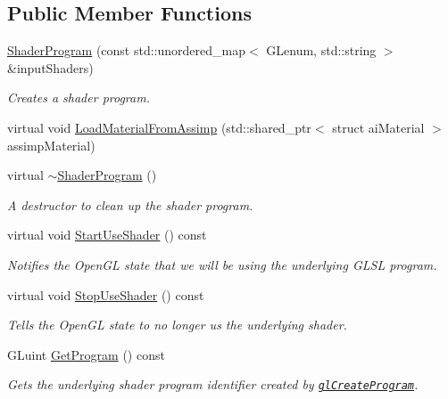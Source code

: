 \subsection*{Public Member Functions}
\begin{DoxyCompactItemize}
\item
\hyperlink{class_shader_program_aba2db5734b2f70cc34078126ad279588}{Shader\+Program} (const std\+::unordered\+\_\+map$<$ G\+Lenum, std\+::string $>$ \&input\+Shaders)
\begin{DoxyCompactList}\small\item\em Creates a shader program. \end{DoxyCompactList}\item
virtual void \hyperlink{class_shader_program_a51ac6fbf3a3d88643eef303a4c3a1fa8}{Load\+Material\+From\+Assimp} (std\+::shared\+\_\+ptr$<$ struct ai\+Material $>$ assimp\+Material)
\item
virtual \hyperlink{class_shader_program_a2d2eadcfc48cc2e2ddb82aba70553a9f}{$\sim$\+Shader\+Program} ()
\begin{DoxyCompactList}\small\item\em A destructor to clean up the shader program. \end{DoxyCompactList}\item
virtual void \hyperlink{class_shader_program_aab1241c0f0962d43687d92866d7b7d6a}{Start\+Use\+Shader} () const
\begin{DoxyCompactList}\small\item\em Notifies the Open\+GL state that we will be using the underlying G\+L\+SL program. \end{DoxyCompactList}\item
virtual void \hyperlink{class_shader_program_a2f2ae9ab4849f855becccfaa445d00d5}{Stop\+Use\+Shader} () const
\begin{DoxyCompactList}\small\item\em Tells the Open\+GL state to no longer us the underlying shader. \end{DoxyCompactList}\item
G\+Luint \hyperlink{class_shader_program_a7313b3596bcd6d982d9624a46cc2acc6}{Get\+Program} () const
\begin{DoxyCompactList}\small\item\em Gets the underlying shader program identifier created by \href{https://www.opengl.org/sdk/docs/man/html/glCreateProgram.xhtml}{\tt gl\+Create\+Program}. \end{DoxyCompactList}\item

\end{DoxyCompactItemize}
